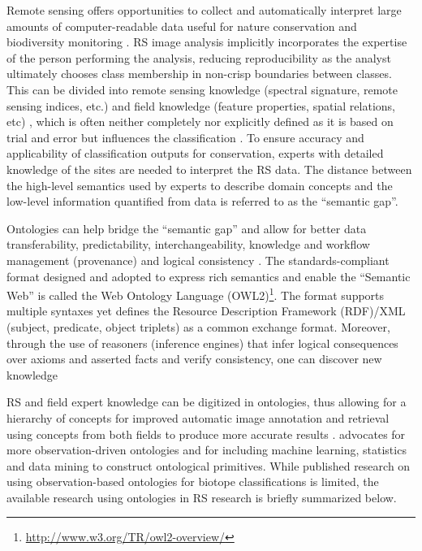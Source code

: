 \documentclass[authoryear, review,12pt,number]{elsarticle}
\begin{document}
Remote sensing offers opportunities to collect and automatically interpret large
amounts of computer-readable data useful for nature conservation and
biodiversity monitoring \citep{Corbane2015, VandenBorre2011, Mayer2011}. RS
image analysis implicitly incorporates the expertise of the person performing
the analysis, reducing reproducibility as the analyst ultimately chooses class
membership in non-crisp boundaries between classes. This can be divided into
remote sensing knowledge (spectral signature, remote sensing indices, etc.) and
field knowledge (feature properties, spatial relations, etc)
\citep{Andres2013a}, which is often neither completely nor explicitly defined as
it is based on trial and error but influences the classification
\citep{Arvor2013}. To ensure accuracy and applicability of classification
outputs for conservation, experts with detailed knowledge of the sites are
needed to interpret the RS data. The distance between the high-level semantics
used by experts to describe domain concepts and the low-level information
quantified from data is referred to as the ``semantic gap''.

Ontologies can help bridge the ``semantic gap'' and allow for better data
transferability, predictability, interchangeability, knowledge and workflow
management (provenance) and logical consistency \citep{Janowicz2012}.  The
standards-compliant format designed and adopted to express rich semantics and
enable the ``Semantic Web'' is called the Web Ontology Language
(OWL2)\footnote{\url{http://www.w3.org/TR/owl2-overview/}}. The format supports
multiple syntaxes yet defines the Resource Description Framework (RDF)/XML
(subject, predicate, object triplets) as a common exchange format.  Moreover,
through the use of reasoners (inference engines) that infer logical consequences
over axioms and asserted facts and verify consistency, one can discover new
knowledge \citep{Arvor2013, Andres2013a}

RS and field expert knowledge can be digitized in ontologies, thus allowing for
a hierarchy of concepts for improved automatic image annotation and retrieval
using concepts from both fields to produce more accurate results
\citep{Srikanth_2005}. \cite{Janowicz2012} advocates for more
observation-driven ontologies and for including machine learning, statistics and
data mining to construct ontological primitives. While published research on
using observation-based ontologies for biotope classifications is limited, the
available research using ontologies in RS research is briefly summarized below.
\end{document}

